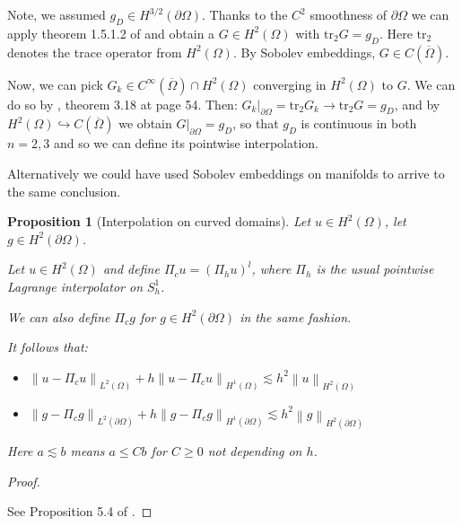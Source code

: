 \documentclass[english,a4paper,10pt,oneside]{scrbook}	%
\theoremstyle{break}
\newtheorem{prop}[equation]{Proposition}
\newenvironment{mproof}[1][\proofname]{%
  \begin{proof}[#1]$ $\par\nobreak\ignorespaces
}{%
  \end{proof}
}
\renewcommand*{\proofname}{Proof}
\theoremstyle{remark}
\newcommand{\norm}[1]{\left\lVert#1\right\rVert}
\newcommand{\tr}{\text{tr}}
\newcommand{\emb}{\hookrightarrow}
\begin{document}
Note, we assumed $g_D \in H^{3/2}(\partial \Omega)$. Thanks to the $C^2$ smoothness of $\partial \Omega$ we can apply theorem 1.5.1.2 of \cite{grisvard} and obtain a $G \in H^2(\Omega)$ with $\tr_2 G = g_D$. Here $\tr_2$ denotes the trace operator from $H^2(\Omega)$. By Sobolev embeddings, $G \in C(\overline{\Omega})$. 

Now, we can pick $G_k \in C^\infty(\overline{\Omega})\cap H^2(\Omega)$ converging in $H^2(\Omega)$ to $G$. We can do so by \cite{adams}, theorem 3.18 at page 54. Then: $G_k|_{\partial \Omega}= \tr_2 G_k \rightarrow \tr_2 G = g_D$, and by $H^2(\Omega)\emb C(\overline{\Omega})$ we obtain $G|_{\partial \Omega} = g_D$, so that $g_D$ is continuous in both $n=2,3$ and so we can define its pointwise interpolation.

Alternatively we could have used Sobolev embeddings on manifolds to arrive to the same conclusion.

\begin{prop}[Interpolation on curved domains]
\label{prop:interp_curv}
Let $u \in H^2(\Omega)$, let $g \in H^2(\partial \Omega)$.

Let $u\in H^2(\Omega)$ and define $\Pi_c u = (\Pi_h u )^l$, where $\Pi_h$ is the usual pointwise Lagrange interpolator on $S^1_h$.

We can also define $\Pi_c g $ for $g \in H^2(\partial \Omega)$ in the same fashion.

It follows that:

\begin{itemize}
	\item $\norm{u-\Pi_c u}_{L^2(\Omega)} + h \norm{u-\Pi_c u}_{H^1(\Omega)}\lesssim h^2\norm{u}_{H^2(\Omega)}$
	\item $\norm{g-\Pi_c g}_{L^2(\partial \Omega)} + h \norm{g-\Pi_c g}_{H^1(\partial \Omega)}\lesssim h^2\norm{g}_{H^2(\partial \Omega)}$
\end{itemize}
Here $a \lesssim b$ means $a \leq Cb$ for $C\geq 0$ not depending on $h$.
\end{prop}

\begin{mproof}
See Proposition 5.4 of \cite{elliott}.
\end{mproof}
\end{document}
